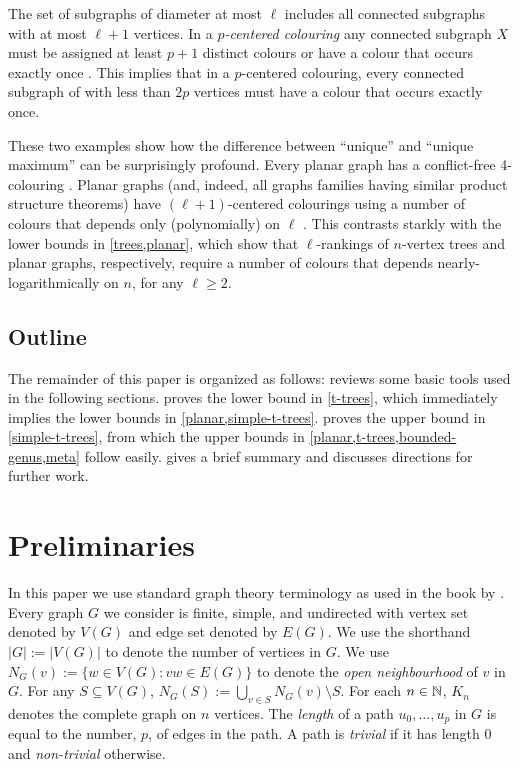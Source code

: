 \documentclass[kpfonts]{patmorin}
\theoremstyle{named}
\begin{document}
The set of subgraphs of diameter at most $\ell$ includes all connected subgraphs with at most $\ell+1$ vertices.  In a \emph{$p$-centered colouring} any connected subgraph $X$ must be assigned at least $p+1$ distinct colours or have a colour that occurs exactly once \cite{nesetril.ossona:tree-depth,nesetril.ossona:grad,zhu:colouring}.  This implies that in a $p$-centered colouring, every connected subgraph of with less than $2p$ vertices must have a colour that occurs exactly once.

These two examples show how the difference between ``unique'' and ``unique maximum'' can be surprisingly profound.  Every planar graph has a conflict-free 4-colouring \cite{abel.alvarez.ea:conflict-free}. Planar graphs (and, indeed, all graphs families having similar product structure theorems) have $(\ell+1)$-centered colourings using a number of colours that depends only (polynomially) on $\ell$ \cite{nesetril.ossona:grad,debski.felsner.ea:improved,pilipczuk.siebertz:polynomial}.  This contrasts starkly with the lower bounds in \cref{trees,planar}, which show that $\ell$-rankings of $n$-vertex trees and planar graphs, respectively, require a number of colours that depends nearly-logarithmically on $n$, for any $\ell\ge 2$.

\subsection{Outline}

The remainder of this paper is organized as follows:  reviews some basic tools used in the following sections.    proves the lower bound in \cref{t-trees}, which immediately implies the lower bounds in \cref{planar,simple-t-trees}.  proves the upper bound in \cref{simple-t-trees}, from which the upper bounds in \cref{planar,t-trees,bounded-genus,meta} follow easily.   gives a brief summary and discusses directions for further work.

\section{Preliminaries}

In this paper we use standard graph theory terminology as used in the book by \citet{diestel:graph}.  Every graph $G$ we consider is finite, simple, and undirected with vertex set denoted by $V(G)$ and edge set denoted by $E(G)$.  We use the shorthand $|G|:=|V(G)|$ to denote the number of vertices in $G$.  We use $N_G(v):=\{w\in V(G): vw\in E(G)\}$ to denote the \emph{open neighbourhood} of $v$ in $G$. For any $S\subseteq V(G)$, $N_G(S):=\bigcup_{v\in S} N_G(v)\setminus S$.  For each $n\in\mathbb{N}$, $K_n$ denotes the complete graph on $n$ vertices.  The \emph{length} of a path $u_0,\ldots,u_p$ in $G$ is equal to the number, $p$, of edges in the path. A path is \emph{trivial} if it has length 0 and \emph{non-trivial} otherwise.
\end{document}
